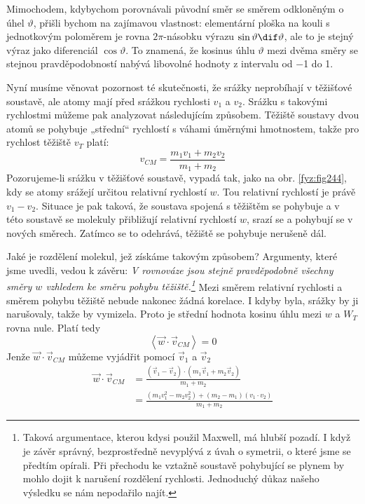     Mimochodem, kdybychom porovnávali původní směr se směrem odkloněným o úhel \(\vartheta\), přišli
    bychom na zajímavou vlastnost: elementární ploška na kouli s jednotkovým poloměrem je rovna
    \(2\pi\)-násobku výrazu \(\sin\vartheta\dif\vartheta\), ale to je stejný výraz jako diferenciál
    \(\cos\vartheta\). To znamená, že kosinus úhlu \(\vartheta\) mezi dvěma směry se stejnou
    pravděpodobností nabývá libovolné hodnoty z intervalu od \num{-1} do \num{+1}.

    Nyní musíme věnovat pozornost té skutečnosti, že srážky neprobíhají v těžišťové soustavě, ale
    atomy mají před srážkou rychlosti \(v_1\) a \(v_2\). Srážku s takovými rychlostmi můžeme pak
    analyzovat následujícím způsobem. Těžiště soustavy dvou atomů se pohybuje „střední“ rychlostí s
    váhami úměrnými hmotnostem, takže pro rychlost těžiště \(v_T\) platí: 
    \begin{equation*}
      v_{CM} = \frac{m_1v_1 + m_2v_2}{m_1 + m_2}
    \end{equation*}
    Pozorujeme-li srážku v těžišťové soustavě, vypadá tak, jako na obr. \ref{fyz:fig244}, kdy se
    atomy srážejí určitou relativní rychlostí \(w\). Tou relativní rychlostí je právě \(v_1-v_2\).
    Situace je pak taková, že soustava spojená s těžištěm se pohybuje a v této soustavě se molekuly
    přibližují relativní rychlostí \(w\), srazí se a pohybují se v nových směrech. Zatímco se to
    odehrává, těžiště se pohybuje nerušeně dál.

    Jaké je rozdělení molekul, jež získáme takovým způsobem? Argumenty, které jsme uvedli, vedou k
    závěru: \emph{V rovnováze jsou stejně pravděpodobně všechny směry \(w\) vzhledem ke směru pohybu
    těžiště.\footnote{Taková argumentace, kterou kdysi použil Maxwell, má hlubší pozadí. I když je
    závěr správný, bezprostředně nevyplývá z úvah o symetrii, o které jsme se předtím opírali. Při
    přechodu ke vztažně soustavě pohybující se plynem by mohlo dojit k narušení rozdělení rychlosti.
    Jednoduchý důkaz našeho výsledku se nám nepodařilo najít.}} Mezi směrem relativní rychlosti a
    směrem pohybu těžiště nebude nakonec žádná korelace. I kdyby byla, srážky by ji narušovaly,
    takže by vymizela. Proto je střední hodnota kosinu úhlu mezi \(w\) a \(W_T\) rovna nule. Platí
    tedy
    \begin{equation}\label{fyz:eq629}
      \left\langle\vec{w}\cdot\vec{v}_{CM}\right\rangle = 0
    \end{equation}
    Jenže \(\vec{w}\cdot\vec{v}_{CM}\) můžeme vyjádřit pomocí \(\vec{v}_1\) a \(\vec{v}_2\)
    \begin{align}
      \vec{w}\cdot\vec{v}_{CM} 
        &= \frac{(\vec{v}_1−\vec{v}_2)\cdot(m_1\vec{v}_1+m_2\vec{v}_2)}{m_1+m_2} \nonumber \\
        &= \frac{(m_1v^2_1−m_2v^2_2)+(m_2−m_1)(v_1\cdot v_2)}{m_1+m_2} \label{fyz:eq630}
    \end{align}


